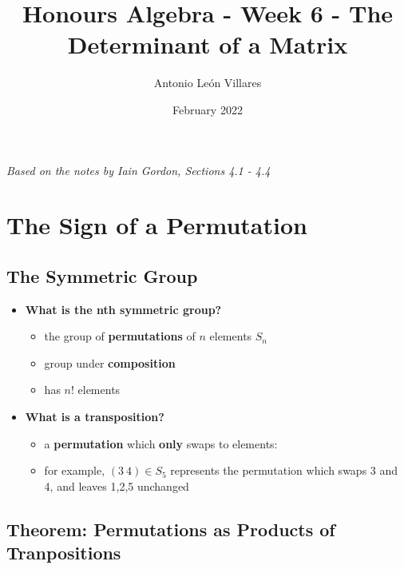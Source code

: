 \documentclass{exam}
\title{Honours Algebra - Week 6 - The Determinant of a Matrix}
\author{Antonio León Villares}
\date{February 2022}
\begin{document}
\maketitle

\tableofcontents

\pagebreak

\textit{Based on the notes by Iain Gordon, Sections 4.1 - 4.4}

\section{The Sign of a Permutation}

\subsection{The Symmetric Group}

\begin{itemize}
    \item \textbf{What is the nth symmetric group?}
    \begin{itemize}
        \item the group of \textbf{permutations} of $n$ elements $S_n$
        \item group under \textbf{composition}
        \item has $n!$ elements
    \end{itemize}
    \item \textbf{What is a transposition?}
    \begin{itemize}
        \item a \textbf{permutation} which \textbf{only} swaps to elements:
        \item for example, $(3 \ 4) \in S_5$ represents the permutation which swaps 3 and 4, and leaves 1,2,5 unchanged
    \end{itemize}
\end{itemize}

\subsection{Theorem: Permutations as Products of Tranpositions}

\end{document}
